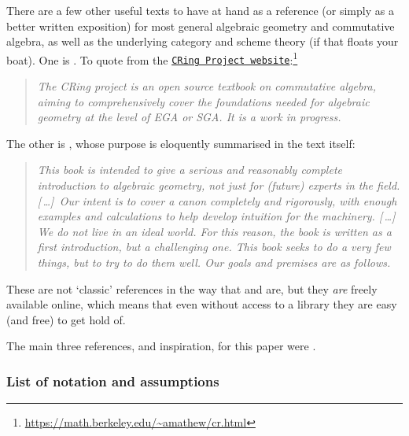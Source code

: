 \documentclass[10pt,notitlepage]{article}
\numberwithin{equation}{subsection}
\newcommand*\elide{\textup{[\,\dots]\,}}
\begin{document}
    There are a few other useful texts to have at hand as a reference (or simply as a better written exposition) for most general algebraic geometry and commutative algebra, as well as the underlying category and scheme theory (if that floats your boat).
    One is \cite{Agrawal:uf}.
    To quote from the \href{https://math.berkeley.edu/~amathew/cr.html}{\texttt{CRing Project website}}:\footnote{\href{https://math.berkeley.edu/~amathew/cr.html}{\url{https://math.berkeley.edu/~amathew/cr.html}}}
    \begin{quotation}
        \emph{The CRing project is an open source textbook on commutative algebra, aiming to comprehensively cover the foundations needed for algebraic geometry at the level of EGA or SGA.
        It is a work in progress.}
    \end{quotation}
    The other is \cite{Vakil:2015wa}, whose purpose is eloquently summarised in the text itself:
    \begin{quotation}
        \emph{
            This book is intended to give a serious and reasonably complete introduction to algebraic geometry, not just for (future) experts in the field.
            \elide
            Our intent is to cover a canon completely and rigorously, with enough examples and calculations to help develop intuition for the machinery. 
            \elide
            We do not live in an ideal world. For this reason, the book is written as a first introduction, but a challenging one.
            This book seeks to do a very few things, but to try to do them well. Our goals and premises are as follows.
        }
    \end{quotation}
    These are not `classic' references in the way that \cite{Hartshorne:1977we} and \cite{Grothendieck:1960tr} are, but they \emph{are} freely available online, which means that even without access to a library they are easy (and free) to get hold of.

    \bigskip

    The main three references, and inspiration, for this paper were \cite{Reid:2002uy,IanoFletcher:2015wc,Dolgachev:1982hz}.

        \subsubsection{List of notation and assumptions} %
        \label{ssub:list_of_notation_and_assumptions}
        
\end{document}
